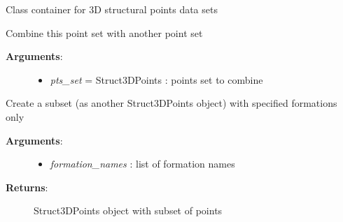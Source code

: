 \documentclass[letterpaper,10pt,english]{sphinxmanual}
\begin{document}
\begin{fulllineitems}
\label{pygeomod:pygeomod.struct_data.Struct3DPoints}
Class container for 3D structural points data sets

\begin{fulllineitems}
\label{pygeomod:pygeomod.struct_data.Struct3DPoints.combine_with}
Combine this point set with another point set
\begin{description}
\item[{\textbf{Arguments}:}] \leavevmode\begin{itemize}
\item {} 
\emph{pts\_set} = Struct3DPoints : points set to combine

\end{itemize}

\end{description}

\end{fulllineitems}


\begin{fulllineitems}
\label{pygeomod:pygeomod.struct_data.Struct3DPoints.create_formation_subset}
Create a subset (as another Struct3DPoints object) with specified formations only
\begin{description}
\item[{\textbf{Arguments}:}] \leavevmode\begin{itemize}
\item {} 
\emph{formation\_names} : list of formation names

\end{itemize}

\item[{\textbf{Returns}:}] \leavevmode
Struct3DPoints object with subset of points

\end{description}

\end{fulllineitems}



\end{fulllineitems}
\end{document}
